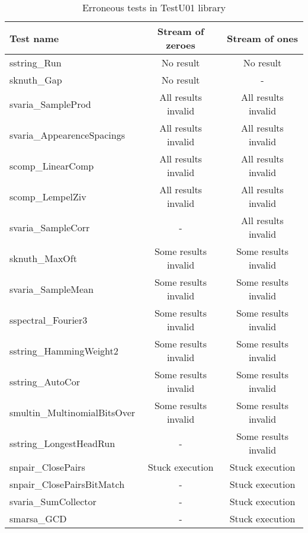\documentclass[
  digital,  	%
  color,		%
  oneside,   	%
  12pt,
  nocover,
  notable,
  nolof,
  nolot,
]{fithesis3}
\begin{document}
\begin{table}[h!]
\begin{nomar}
\centering
\begin{tabular}{l || c | c }
\textbf{Test name}                 & \textbf{Stream of zeroes} & \textbf{Stream of ones} \\ \hline \hline    
sstring\_Run                       & No result                & No result                \\
sknuth\_Gap                        & No result                & -                        \\ \hline
svaria\_SampleProd                 & All results invalid      & All results invalid      \\
svaria\_AppearenceSpacings         & All results invalid      & All results invalid      \\   
scomp\_LinearComp                  & All results invalid      & All results invalid      \\
scomp\_LempelZiv                   & All results invalid      & All results invalid      \\
svaria\_SampleCorr                 & -                        & All results invalid      \\ \hline
sknuth\_MaxOft                     & Some results invalid     & Some results invalid     \\
svaria\_SampleMean                 & Some results invalid     & Some results invalid     \\
sspectral\_Fourier3                & Some results invalid     & Some results invalid     \\
sstring\_HammingWeight2            & Some results invalid     & Some results invalid     \\
sstring\_AutoCor                   & Some results invalid     & Some results invalid     \\
smultin\_MultinomialBitsOver       & Some results invalid     & Some results invalid     \\
sstring\_LongestHeadRun            & -                        & Some results invalid     \\ \hline
snpair\_ClosePairs                 & Stuck execution          & Stuck execution          \\
snpair\_ClosePairsBitMatch         & -                        & Stuck execution          \\
svaria\_SumCollector               & -                        & Stuck execution          \\
smarsa\_GCD                        & -                        & Stuck execution          \\                                       
\end{tabular}
\end{nomar}  
\caption{Erroneous tests in TestU01 library}
\label{tab:testu01-errors}                                                                                           
\end{table}
\end{document}
